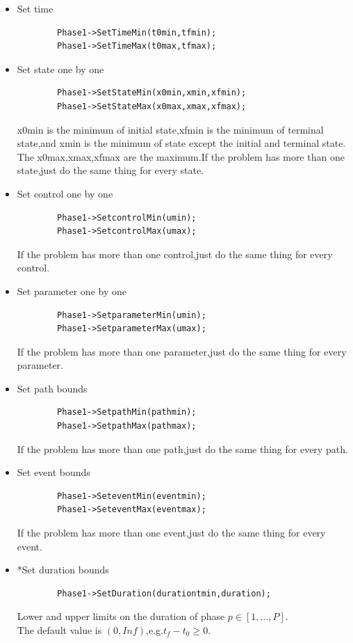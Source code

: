 \documentclass[10pt]{article}
\begin{document}
    \begin{itemize}
    	\item Set time\\
    	\begin{lstlisting}
    	Phase1->SetTimeMin(t0min,tfmin);
    	Phase1->SetTimeMax(t0max,tfmax);
    	\end{lstlisting}
    	\item Set state one by one\\
    	\begin{lstlisting}
    	Phase1->SetStateMin(x0min,xmin,xfmin);
    	Phase1->SetStateMax(x0max,xmax,xfmax);
    	\end{lstlisting}
    	x0min is the minimum of initial state,xfmin is the minimum of terminal state,and xmin is the minimum of state except the initial and terminal state.
    	The x0max,xmax,xfmax are the maximum.If the problem has more than one state,just do the same thing for every state.
    	\item Set control one by one
    	\begin{lstlisting}
    	Phase1->SetcontrolMin(umin);
    	Phase1->SetcontrolMax(umax);
    	\end{lstlisting}
    	If the problem has more than one control,just do the same thing for every control.
    	\item Set parameter one by one
    	\begin{lstlisting}
    	Phase1->SetparameterMin(umin);
    	Phase1->SetparameterMax(umax);
    	\end{lstlisting}
    	If the problem has more than one parameter,just do the same thing for every parameter.
    	\item Set path bounds
    	\begin{lstlisting}
    	Phase1->SetpathMin(pathmin);
    	Phase1->SetpathMax(pathmax);
    	\end{lstlisting}
    	If the problem has more than one path,just do the same thing for every path.	
    	\item Set event bounds
    	\begin{lstlisting}
    	Phase1->SeteventMin(eventmin);
    	Phase1->SeteventMax(eventmax);
    	\end{lstlisting}
    	If the problem has more than one event,just do the same thing for every event.
    	\item *Set duration bounds
    	\begin{lstlisting}
    	Phase1->SetDuration(durationtmin,duration);
    	\end{lstlisting}
    	Lower and upper limits on the duration of phase $p\in[1,\ldots,P]$.\\
    	The default value is $(0,Inf)$,e.g.$t_f-t_0\geq0$.
    \end{itemize}
    
\end{document}
